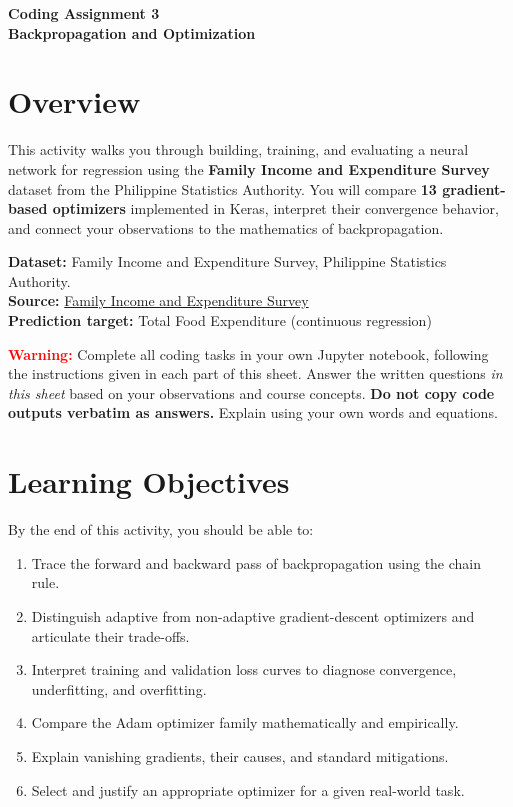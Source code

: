 \documentclass[12pt,a4paper]{article}
\begin{document}
\begin{center}
  {\LARGE\bfseries\color{headerblue}
    Coding Assignment 3\\[4pt]
    Backpropagation and Optimization}\\[10pt]
\end{center}

\section*{Overview}

This activity walks you through building, training, and evaluating a neural network
for regression using the \textbf{Family Income and Expenditure Survey} dataset
from the Philippine Statistics Authority. You will compare \textbf{13 gradient-based
optimizers} implemented in Keras, interpret their convergence behavior, and connect
your observations to the mathematics of backpropagation.

\begin{instructionbox}
\textbf{Dataset:} Family Income and Expenditure Survey, Philippine Statistics Authority.\\
\textbf{Source:} \href{https://www.kaggle.com/datasets/grosvenpaul/family-income-and-expenditure}{Family Income and Expenditure Survey}\\
\textbf{Prediction target:} Total Food Expenditure (continuous regression)
\end{instructionbox}

\begin{warningbox}
\textbf{\textcolor{red}{Warning:}} Complete all coding tasks in your own Jupyter notebook,
following the instructions given in each part of this sheet. Answer the written
questions \emph{in this sheet} based on your observations and course concepts.
\textbf{Do not copy code outputs verbatim as answers.} Explain using your own words
and equations.
\end{warningbox}

\section*{Learning Objectives}

By the end of this activity, you should be able to:
\begin{enumerate}[leftmargin=*, label=\arabic*.]
  \item Trace the forward and backward pass of backpropagation using the chain rule.
  \item Distinguish adaptive from non-adaptive gradient-descent optimizers and articulate
        their trade-offs.
  \item Interpret training and validation loss curves to diagnose convergence, underfitting,
        and overfitting.
  \item Compare the Adam optimizer family mathematically
        and empirically.
  \item Explain vanishing gradients, their causes, and standard mitigations.
  \item Select and justify an appropriate optimizer for a given real-world task.
\end{enumerate}
\end{document}
